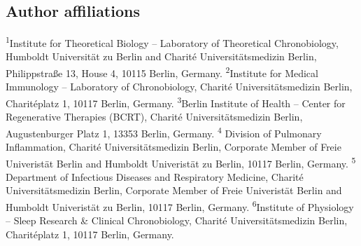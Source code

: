 \subsection*{Author affiliations}
\textsuperscript{1}Institute for Theoretical Biology -- Laboratory of Theoretical Chronobiology, Humboldt Universit\"at zu Berlin and Charit\'e Universit\"atsmedizin Berlin, Philippstra\ss e 13, House 4, 10115 Berlin, Germany. \textsuperscript{2}Institute for Medical Immunology -- Laboratory of Chronobiology, Charité Universitätsmedizin Berlin, Charitéplatz 1, 10117 Berlin, Germany. \textsuperscript{3}Berlin Institute of Health -- Center for Regenerative Therapies (BCRT), Charit\'e Universit\"atsmedizin Berlin, Augustenburger Platz 1,
13353 Berlin, Germany. \textsuperscript{4} Division of Pulmonary Inflammation, Charité Universitätsmedizin Berlin, Corporate Member of Freie Univeristät Berlin and Humboldt Univeristät zu Berlin, 10117 Berlin, Germany. \textsuperscript{5} Department of Infectious Diseases and Respiratory Medicine, Charité Universitätsmedizin Berlin, Corporate Member of Freie Univeristät Berlin and Humboldt Univeristät zu Berlin, 10117 Berlin, Germany. \textsuperscript{6}Institute of Physiology -- Sleep Research \& Clinical Chronobiology, Charit\'e Universit\"atsmedizin Berlin, Charit\'eplatz 1, 10117 Berlin, Germany.